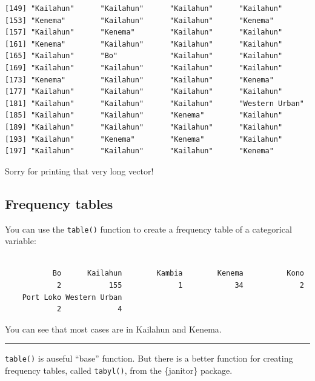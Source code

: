 \documentclass[
  letterpaper,
  DIV=11,
  numbers=noendperiod]{scrreprt}
\newenvironment{Shaded}{\begin{snugshade}}{\end{snugshade}}
\newcommand{\FunctionTok}[1]{\textcolor[rgb]{0.28,0.35,0.67}{#1}}
\newcommand{\NormalTok}[1]{\textcolor[rgb]{0.00,0.23,0.31}{#1}}
\newcommand{\SpecialCharTok}[1]{\textcolor[rgb]{0.37,0.37,0.37}{#1}}
\begin{document}
\begin{verbatim}
[149] "Kailahun"      "Kailahun"      "Kailahun"      "Kailahun"     
[153] "Kenema"        "Kailahun"      "Kailahun"      "Kenema"       
[157] "Kailahun"      "Kenema"        "Kailahun"      "Kailahun"     
[161] "Kenema"        "Kailahun"      "Kailahun"      "Kailahun"     
[165] "Kailahun"      "Bo"            "Kailahun"      "Kailahun"     
[169] "Kailahun"      "Kailahun"      "Kailahun"      "Kailahun"     
[173] "Kenema"        "Kailahun"      "Kailahun"      "Kenema"       
[177] "Kailahun"      "Kailahun"      "Kailahun"      "Kailahun"     
[181] "Kailahun"      "Kailahun"      "Kailahun"      "Western Urban"
[185] "Kailahun"      "Kailahun"      "Kenema"        "Kailahun"     
[189] "Kailahun"      "Kailahun"      "Kailahun"      "Kailahun"     
[193] "Kailahun"      "Kenema"        "Kenema"        "Kailahun"     
[197] "Kailahun"      "Kailahun"      "Kailahun"      "Kenema"       
\end{verbatim}

Sorry for printing that very long vector!

\subsection{Frequency tables}\label{frequency-tables}

You can use the \texttt{table()} function to create a frequency table of
a categorical variable:

\begin{Shaded}
\end{Shaded}

\begin{verbatim}

           Bo      Kailahun        Kambia        Kenema          Kono 
            2           155             1            34             2 
    Port Loko Western Urban 
            2             4 
\end{verbatim}

You can see that most cases are in Kailahun and Kenema.

\begin{center}\rule{0.5\linewidth}{0.5pt}\end{center}

\texttt{table()} is auseful ``base'' function. But there is a better
function for creating frequency tables, called \texttt{tabyl()}, from
the \{janitor\} package.
\end{document}
